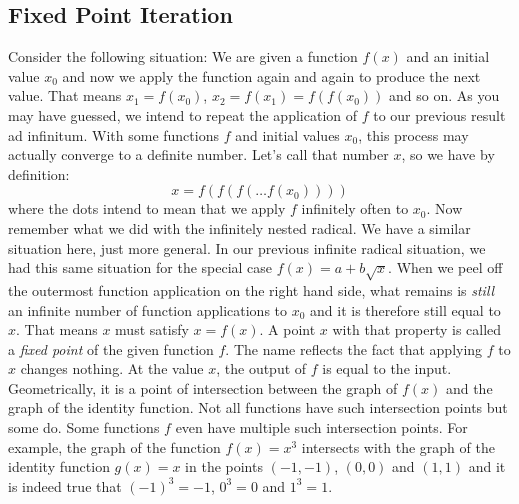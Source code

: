 




\subsection{Fixed Point Iteration}
Consider the following situation: We are given a function $f(x)$ and an initial value $x_0$ and now we apply the function again and again to produce the next value. That means $x_1 = f(x_0)$, $x_2 = f(x_1) = f(f(x_0))$ and so on. As you may have guessed, we intend to repeat the application of $f$ to our previous result ad infinitum. With some functions $f$ and initial values $x_0$, this process may actually converge to a definite number. Let's call that number $x$, so we have by definition:
\begin{equation}
 x = f(f(f( \ldots f(x_0))))
\end{equation}
where the dots intend to mean that we apply $f$ infinitely often to $x_0$. Now remember what we did with the infinitely nested radical. We have a similar situation here, just more general. In our previous infinite radical situation, we had this same situation for the special case $f(x) = a + b \sqrt{x}$. When we peel off the outermost function application on the right hand side, what remains is \emph{still} an infinite number of function applications to $x_0$ and it is therefore still equal to $x$. That means $x$ must satisfy $x = f(x)$. A point $x$ with that property is called a \emph{fixed point} of the given function $f$. The name reflects the fact that applying $f$ to $x$ changes nothing. At the value $x$, the output of $f$ is equal to the input. Geometrically, it is a point of intersection between the graph of $f(x)$ and the graph of the identity function. Not all functions have such intersection points but some do. Some functions $f$ even have multiple such intersection points. For example, the graph of the function $f(x) = x^3$ intersects with the graph of the identity function $g(x) = x$ in the points $(-1,-1)$, $(0,0)$ and $(1,1)$ and it is indeed true that $(-1)^3 = -1$, $0^3 = 0$ and $1^3 = 1$.

